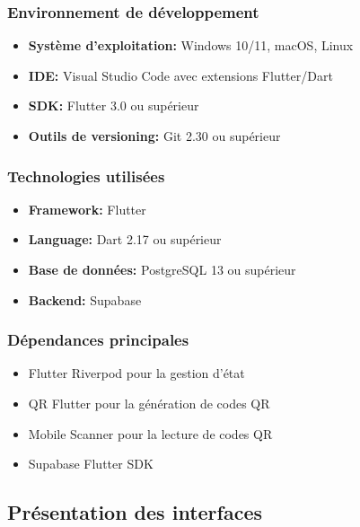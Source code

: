 \subsubsection{Environnement de développement}
\begin{itemize}
    \item \textbf{Système d'exploitation:} Windows 10/11, macOS, Linux
    \item \textbf{IDE:} Visual Studio Code avec extensions Flutter/Dart
    \item \textbf{SDK:} Flutter 3.0 ou supérieur
    \item \textbf{Outils de versioning:} Git 2.30 ou supérieur
\end{itemize}

\subsubsection{Technologies utilisées}
\begin{itemize}
    \item \textbf{Framework:} Flutter
    \item \textbf{Language:} Dart 2.17 ou supérieur
    \item \textbf{Base de données:} PostgreSQL 13 ou supérieur
    \item \textbf{Backend:} Supabase
\end{itemize}

\subsubsection{Dépendances principales}
\begin{itemize}
    \item Flutter Riverpod pour la gestion d'état
    \item QR Flutter pour la génération de codes QR
    \item Mobile Scanner pour la lecture de codes QR
    \item Supabase Flutter SDK
\end{itemize}

\subsection{Présentation des interfaces}

